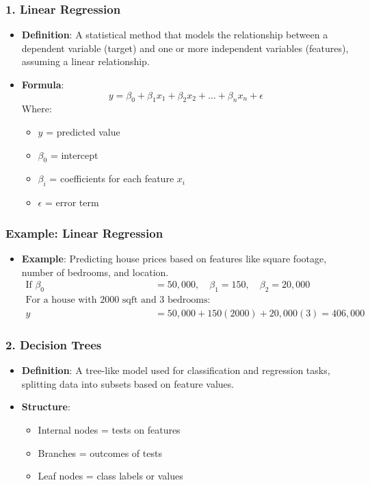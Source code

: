 \documentclass[aspectratio=169]{beamer}
\begin{document}
\begin{frame}[fragile]
    \frametitle{1. Linear Regression}
    \begin{itemize}
        \item \textbf{Definition}: A statistical method that models the relationship between a dependent variable (target) and one or more independent variables (features), assuming a linear relationship.
        \item \textbf{Formula}:
        \begin{equation}
            y = \beta_0 + \beta_1 x_1 + \beta_2 x_2 + \ldots + \beta_n x_n + \epsilon
        \end{equation}
        Where:
        \begin{itemize}
            \item $y$ = predicted value
            \item $\beta_0$ = intercept
            \item $\beta_i$ = coefficients for each feature $x_i$
            \item $\epsilon$ = error term
        \end{itemize}
    \end{itemize}
\end{frame}

\begin{frame}[fragile]
    \frametitle{Example: Linear Regression}
    \begin{itemize}
        \item \textbf{Example}: Predicting house prices based on features like square footage, number of bedrooms, and location.
        \begin{align*}
            \text{If } \beta_0 &= 50,000, \quad \beta_1 = 150, \quad \beta_2 = 20,000 \\
            \text{For a house with } 2000 \text{ sqft and } 3 \text{ bedrooms: } \\
            y &= 50,000 + 150(2000) + 20,000(3) = 406,000
        \end{align*}
    \end{itemize}
\end{frame}

\begin{frame}[fragile]
    \frametitle{2. Decision Trees}
    \begin{itemize}
        \item \textbf{Definition}: A tree-like model used for classification and regression tasks, splitting data into subsets based on feature values.
        \item \textbf{Structure}:
        \begin{itemize}
            \item Internal nodes = tests on features
            \item Branches = outcomes of tests
            \item Leaf nodes = class labels or values
        \end{itemize}
    \end{itemize}
\end{frame}
\end{document}
